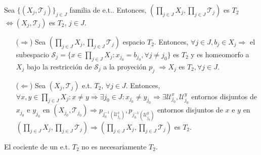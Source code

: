 \begin{prop}
    Sea $\{ ( X_{j}, \mathcal{T}_{j} ) \}_{j \in J}$ familia de e.t.. Entonces, $( \prod_{j \in J} X_{j}, \prod_{j \in J} \mathcal{T}_{j} )$ es $T_{2}$ $\Leftrightarrow ( X_{j}, \mathcal{T}_{j} )$ es $ T_{2}$, $j \in J$.
\end{prop}

\begin{dem}
  \begin{enumerate}[label=(\roman*)]
    \item [($\Rightarrow$)] Sea $( \prod_{j \in J} X_{j}, \prod_{j \in J} \mathcal{T}_{j} )$ espacio $T_{2}$. Entonces, $\forall j \in J, b_{j} \in X_{j} \Rightarrow $ el subespacio $ \mathcal{S}_{j} = \{ x \in \prod_{j \in J} X_{j} : x_{j_{0}} = b_{j_{0}}, \forall j \neq j_{0} \}$ es $T_{2}$ y es homeomorfo a $X_{j}$ bajo la restricción de $\mathcal{S}_{j} $ a la proyeción $p_{j}$ $ \Rightarrow X_{j}$ es $T_{2}, \forall j \in J$.
    \item [($\Leftarrow$)] Sea $( X_{j}, \mathcal{T}_{j} )$ e.t. $T_{2}$, $\forall j \in J$. Entonces, $\forall x,y \in \prod_{j \in J} X_{j} : x \neq y \Rightarrow \exists j_{0} \in J : x_{j_{0}} \neq y_{j_{0}} \Rightarrow \exists \mathcal{U}^{x}_{j_{0}}, \mathcal{U}^{y}_{j_{0}}$ entornos disjuntos de $x_{j_{0}}$ e $y_{j_{0}}$ en $( X_{j_{0}}, \mathcal{T}_{j_{0}} ) \Rightarrow p_{j_{0}^{-1}(\mathcal{U}^{x}_{j_{0}})}, p_{j_{0}^{-1}(\mathcal{U}^{y}_{j_{0}})}$ entornos disjuntos de $x$ e $y$ en $( \prod_{j \in J} X_{j}, \prod_{j \in J} \mathcal{T}_{j} ) \Rightarrow ( \prod_{j \in J} X_{j}, \prod_{j \in J} \mathcal{T}_{j} )$ es $T_{2}$.
  \end{enumerate}
\end{dem}

\begin{obs}
  El cociente de un e.t. $T_{2}$ no es necesariamente $T_{2}$.
\end{obs}
